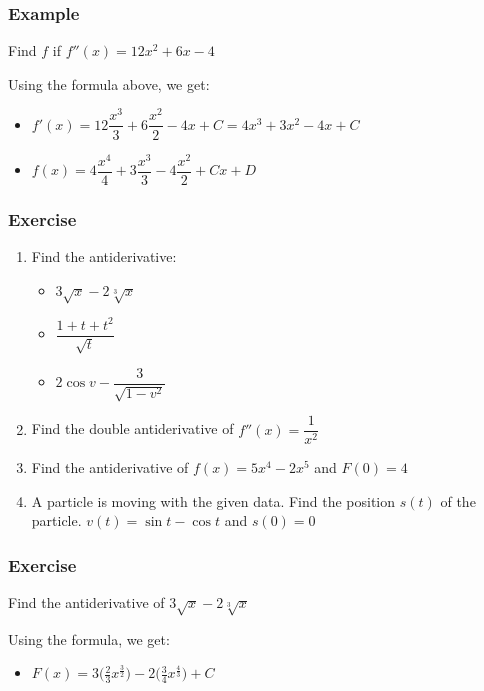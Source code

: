 \documentclass[t]{beamer}
\theoremstyle{plain}
\theoremstyle{definition}
\begin{document}
\begin{frame}

\frametitle{Example}

Find $f$ if $f''(x) =12x^2 + 6x -4$ \pause

\medskip

Using the formula above, we get:
\begin{itemize}
	\item $f'(x) = 12\dfrac{x^3}{3} + 6\dfrac{x^2}{2} - 4x + C = 4x^3 + 3x^2 - 4x + C$
	\item $f(x) = 4\dfrac{x^4}{4} + 3\dfrac{x^3}{3} -4\dfrac{x^2}{2} + Cx + D$
\end{itemize}

\end{frame}

\begin{frame}

\frametitle{Exercise}

\begin{enumerate}
\item Find the antiderivative:
\begin{itemize}
	\item $3\sqrt{x} - 2\sqrt[3]{x}$
	\item $\dfrac{1 + t + t^2}{\sqrt{t}}$
	\item $2\cos{v} - \dfrac{3}{\sqrt{1-v^2}}$
\end{itemize}
\item Find the double antiderivative of $f''(x) =\dfrac{1}{x^2}$
\item Find the antiderivative of $f(x) = 5x^4 - 2x^5$ and $F(0) = 4$
\item A particle is moving with the given data.  Find the position $s(t)$ of the particle.  $v(t) = \sin{t} - \cos{t}$ and $s(0) = 0$
\end{enumerate}

\end{frame}



\begin{frame}

\frametitle{Exercise}

Find the antiderivative of $3\sqrt{x} - 2\sqrt[3]{x}$

\medskip

Using the formula, we get:
\begin{itemize}
	\item $F(x) = 3\big(\frac{2}{3}x^{\frac{3}{2}}\big) - 2 \big(\frac{3}{4}x^{\frac{4}{3}}\big) + C$
\end{itemize}

\end{frame}
\end{document}
